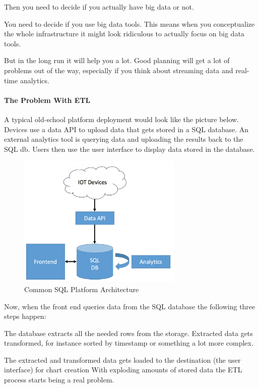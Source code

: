 \documentclass[12pt]{scrartcl} %
\begin{document}
Then you need to decide if you actually have big data or not.

You need to decide if you use big data tools. This means when you conceptualize the whole infrastructure it might look ridiculous to actually focus on big data tools.

But in the long run it will help you a lot. Good planning will get a lot of problems out of the way, especially if you think about streaming data and real-time analytics.

\paragraph{The Problem With ETL}
A typical old-school platform deployment would look like the picture below. Devices use a data API to upload data that gets stored in a SQL database. An external analytics tool is querying data and uploading the results back to the SQL db. Users then use the user interface to display data stored in the database.

\begin{figure}[htbp] 
  \centering
     \includegraphics[width=0.7\textwidth]{images/Common-SQL-Architecture}
  \caption{Common SQL Platform Architecture}
  \label{fig:Bild1}
\end{figure}

Now, when the front end queries data from the SQL database the following three steps happen:

The database extracts all the needed rows from the storage. Extracted data gets transformed, for instance sorted by timestamp or something a lot more complex.

The extracted and transformed data gets loaded to the destination (the user interface) for chart creation
With exploding amounts of stored data the ETL process starts being a real problem.
\end{document}
